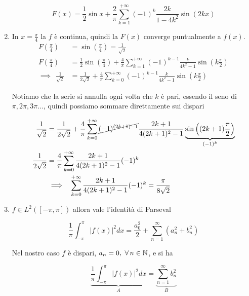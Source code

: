 \begin{enumerate}
\begin{equation*}
F(x) = \frac{1}{2}\sin x + \frac{2}{\pi }\sum ^{ + \infty }_{k = 1}(- 1)^{k}\frac{2k}{1 - 4k^{2}}\sin(2kx)
\end{equation*}
\item In $x = \frac{\pi }{4}$ la $f$ è continua, quindi la $F(x)$ converge puntualmente a $f(x)$.\begin{align*}
F\left(\frac{\pi }{4}\right) & = \sin\left(\frac{\pi }{4}\right) = \frac{1}{\sqrt{2}}\\
F\left(\frac{\pi }{4}\right) & = \frac{1}{2}\sin\left(\frac{\pi }{4}\right) + \frac{4}{\pi }\sum ^{ + \infty }_{k = 1}(- 1)^{k - 1}\frac{k}{4k^{2} - 1}\sin\left(k\frac{\pi }{2}\right)\\
\implies \ \ \frac{1}{\sqrt{2}} & = \frac{1}{2\sqrt{2}} + \frac{4}{\pi }\sum ^{ + \infty }_{k = 0}(- 1)^{k - 1}\frac{k}{4k^{2} - 1}\sin\left(k\frac{\pi }{2}\right)
\end{align*}

Notiamo che la serie si annulla ogni volta che $k$ è pari, essendo il seno di $\pi ,2\pi ,3\pi \dotsc $, quindi possiamo sommare direttamente sui dispari

\begin{equation*}
\begin{aligned}
\frac{1}{\sqrt{2}} & = \frac{1}{2\sqrt{2}} + \frac{4}{\pi }\sum ^{ + \infty }_{k = 0}\cancel{(- 1)^{(2k + 1) - 1}}\frac{2k + 1}{4(2k + 1)^{2} - 1}\underbrace{\sin\left((2k + 1)\frac{\pi }{2}\right)}_{(- 1)^{k}}\\
\frac{1}{2\sqrt{2}} & = \frac{4}{\pi }\sum ^{ + \infty }_{k = 0}\frac{2k + 1}{4(2k + 1)^{2} - 1}(- 1)^{k}\\
 & \implies \ \ \sum ^{ + \infty }_{k = 0}\frac{2k + 1}{4(2k + 1)^{2} - 1}(- 1)^{k} = \frac{\pi }{8\sqrt{2}}
\end{aligned}
\end{equation*}
\item $f\in L^{2}([ - \pi ,\pi ])$ allora vale l'identità di Parseval

\begin{equation*}
\frac{1}{\pi }\int ^{\pi }_{ - \pi }| f(x)| ^{2} dx = \frac{a^{2}_{0}}{2} + \sum\limits ^{\infty }_{n = 1}\left(a^{2}_{n} + b^{2}_{n}\right)
\end{equation*}

Nel nostro caso $f$ è dispari, $a_{n} = 0,\ \forall n\in \NN $, e si ha

\begin{equation*}
\underbrace{\frac{1}{\pi }\int ^{\pi }_{ - \pi }| f(x)| ^{2} dx}_{A} = \underbrace{\sum\limits ^{\infty }_{n = 1} b^{2}_{n}}_{B}
\end{equation*}


\end{enumerate}
